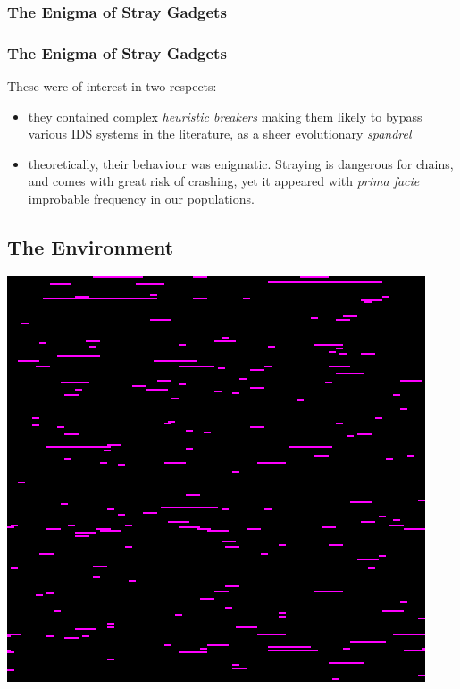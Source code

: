 \documentclass[11pt]{article}
\begin{document}
\subsubsection*{The Enigma of Stray Gadgets}
\label{sec:orga65dca2}

\subsubsection*{The Enigma of Stray Gadgets}
\label{sec:org4b3f558}
These were of interest in two respects:

\begin{itemize}
\item they contained complex \emph{heuristic breakers} making them likely to bypass various IDS systems in the literature, as a sheer evolutionary \emph{spandrel}
\item theoretically, their behaviour was enigmatic. Straying is dangerous for chains, and comes with great risk of crashing, yet it appeared with \emph{prima facie} improbable frequency in our populations.
\end{itemize}

\subsection*{The Environment}
\label{sec:org1f8fa4b}
\begin{center}
\includegraphics[width=.9\linewidth]{./img/tomato-RT-N18U-httpd_heatmap.png}
\end{center}
\end{document}
